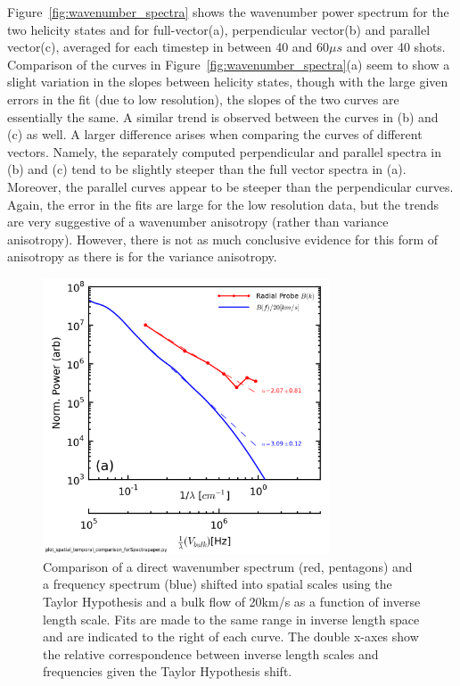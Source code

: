 \documentclass[aip,prl,amsmath,amssymb,reprint,superscriptaddress]{revtex4-1} %
\begin{document}
Figure~\ref{fig:wavenumber_spectra} shows the wavenumber power spectrum for the two helicity states and for full-vector(a), perpendicular vector(b) and parallel vector(c), averaged for each timestep in between 40 and 60$\mu s$ and over 40 shots. Comparison of the curves in Figure~\ref{fig:wavenumber_spectra}(a) seem to show a slight variation in the slopes between helicity states, though with the large given errors in the fit (due to low resolution), the slopes of the two curves are essentially the same. A similar trend is observed between the curves in (b) and (c) as well. A larger difference arises when comparing the curves of different vectors. Namely, the separately computed perpendicular and parallel spectra in (b) and (c) tend to be slightly steeper than the full vector spectra in (a). Moreover, the parallel curves appear to be steeper than the perpendicular curves. Again, the error in the fits are large for the low resolution data, but the trends are very suggestive of a wavenumber anisotropy (rather than variance anisotropy). However, there is not as much conclusive evidence for this form of anisotropy as there is for the variance anisotropy.

\begin{figure}[!htbp]
\centerline{
\includegraphics[width=8.5cm]{B_spatial_temporal_comp_wFits_40t60us}}
\caption{\label{fig:wavenumber_comp} Comparison of a direct wavenumber spectrum (red, pentagons) and a frequency spectrum (blue) shifted into spatial scales using the Taylor Hypothesis and a bulk flow of 20km/s as a function of inverse length scale. Fits are made to the same range in inverse length space and are indicated to the right of each curve. The double x-axes show the relative correspondence between inverse length scales and frequencies given the Taylor Hypothesis shift.}
\end{figure}
\end{document}
